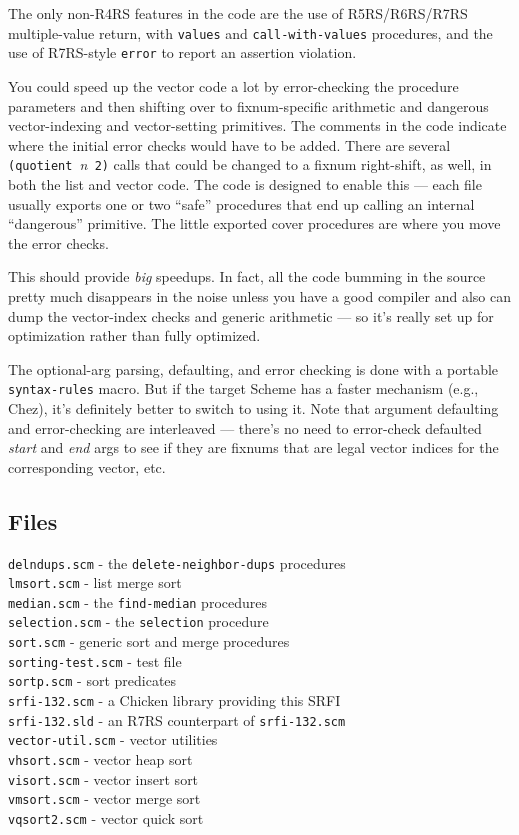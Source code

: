 The only non-R4RS features in the code are the use of R5RS/R6RS/R7RS
multiple-value return, with \texttt{values} and
\texttt{call-with-values} procedures, and the use of R7RS-style
\texttt{error} to report an assertion violation.

You could speed up the vector code a lot by error-checking the procedure
parameters and then shifting over to fixnum-specific arithmetic and
dangerous vector-indexing and vector-setting primitives. The comments in
the code indicate where the initial error checks would have to be added.
There are several \texttt{(quotient\ }\emph{n}\texttt{\ 2)} calls that
could be changed to a fixnum right-shift, as well, in both the list and
vector code. The code is designed to enable this --- each file usually
exports one or two ``safe'' procedures that end up calling an internal
``dangerous'' primitive. The little exported cover procedures are where
you move the error checks.

This should provide \emph{big} speedups. In fact, all the code bumming
in the source pretty much disappears in the noise unless you have a good
compiler and also can dump the vector-index checks and generic
arithmetic --- so it's really set up for optimization rather than fully
optimized.

The optional-arg parsing, defaulting, and error checking is done with a
portable \texttt{syntax-rules} macro. But if the target Scheme has a
faster mechanism (e.g., Chez), it's definitely better to switch to using
it. Note that argument defaulting and error-checking are interleaved ---
there's no need to error-check defaulted \emph{start} and \emph{end}
args to see if they are fixnums that are legal vector indices for the
corresponding vector, etc.

\subsection{Files}\label{Files}

\texttt{delndups.scm} - the \texttt{delete-neighbor-dups} procedures\\
\texttt{lmsort.scm} - list merge sort\\
\texttt{median.scm} - the \texttt{find-median} procedures\\
\texttt{selection.scm} - the \texttt{selection} procedure\\
\texttt{sort.scm} - generic sort and merge procedures\\
\texttt{sorting-test.scm} - test file\\
\texttt{sortp.scm} - sort predicates\\
\texttt{srfi-132.scm} - a Chicken library providing this SRFI\\
\texttt{srfi-132.sld} - an R7RS counterpart of \texttt{srfi-132.scm}\\
\texttt{vector-util.scm} - vector utilities\\
\texttt{vhsort.scm} - vector heap sort\\
\texttt{visort.scm} - vector insert sort\\
\texttt{vmsort.scm} - vector merge sort\\
\texttt{vqsort2.scm} - vector quick sort\\


